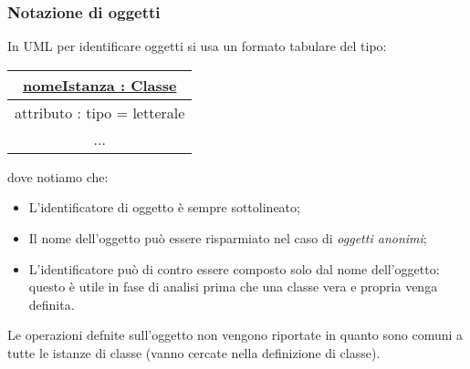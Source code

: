 \documentclass[a4paper,11pt]{article}
\begin{document}
\subsubsection{Notazione di oggetti}
In UML per identificare oggetti si usa un formato tabulare del tipo:
\begin{table}[H]
	\center 
	\begin{tabular} { | c | }
		\hline
		\underline{nomeIstanza : Classe} \\
		\hline
		attributo : tipo = letterale \\
		... \\
		\hline
	\end{tabular}
\end{table}
dove notiamo che:
\begin{itemize}
	\item L'identificatore di oggetto è sempre sottolineato;
	\item Il nome dell'oggetto può essere risparmiato nel caso di \textit{oggetti anonimi};
	\item L'identificatore può di contro essere composto solo dal nome dell'oggetto: questo è utile in fase di analisi prima che una classe vera e propria venga definita.
\end{itemize}

Le operazioni defnite sull'oggetto non vengono riportate in quanto sono comuni a tutte le istanze di classe (vanno cercate nella definizione di classe). 
\end{document}

